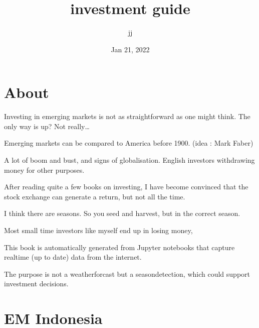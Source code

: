 \documentclass[letterpaper,10pt,english]{sphinxmanual}
\title{investment guide}
\date{Jan 21, 2022}
\author{jj}
\begin{document}
\pagestyle{empty}
\sphinxmaketitle
\pagestyle{plain}
\sphinxtableofcontents
\pagestyle{normal}
\label{\detokenize{index::doc}}



\chapter{About}
\label{\detokenize{about:about}}\label{\detokenize{about::doc}}
\sphinxAtStartPar
Investing in emerging markets is not as straightforward as one might think.
The only way is up? Not really…

\sphinxAtStartPar
Emerging markets can be compared to America before 1900. (idea : Mark Faber)

\sphinxAtStartPar
A lot of boom and bust, and signs of globalisation.
English investors withdrawing money for other purposes.

\sphinxAtStartPar
After reading quite a few books on investing, I have become convinced that the stock exchange can generate a return, but not all the time.

\sphinxAtStartPar
I think there are seasons. So you seed and harvest, but in the correct season.

\sphinxAtStartPar
Most small time investors like myself end up in losing money,

\sphinxAtStartPar
This book is automatically generated from Jupyter notebooks that capture realtime (up to date) data from the internet.

\sphinxAtStartPar
The purpose is not a weatherforcast but a season\sphinxhyphen{}detection, which could support investment decisions.


\chapter{EM Indonesia}
\label{\detokenize{indonesia:em-indonesia}}\label{\detokenize{indonesia::doc}}
\end{document}
